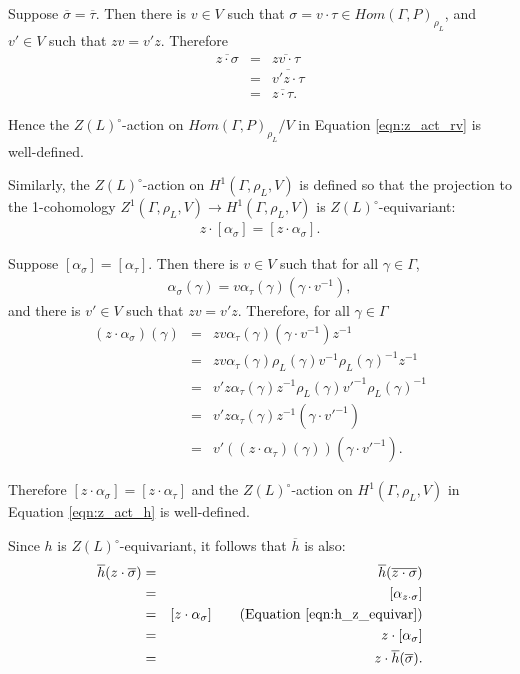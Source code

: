 Suppose $\overline{\sigma} = \overline{\tau}$. Then there is $v \in V$ such that $\sigma = v \cdot \tau \in Hom(\Gamma, P)_{\rho_L}$, and $v' \in V$ such that $zv = v' z$. Therefore
\begin{eqnarray*}
  \overline{z \cdot \sigma} &=& \overline{zv \cdot \tau} \\
  &=& \overline{v' z \cdot \tau} \\
  &=& \overline{z \cdot \tau}.
\end{eqnarray*}

Hence the $Z(L)^\circ$-action on $Hom(\Gamma, P)_{\rho_L}/V$ in Equation \ref{eqn:z_act_rv} is well-defined.

Similarly, the $Z(L)^\circ$-action on $H^1(\Gamma, \rho_L, V)$ is defined so that the projection to the 1-cohomology $Z^1(\Gamma, \rho_L, V) \rightarrow H^1(\Gamma, \rho_L, V)$ is $Z(L)^\circ$-equivariant:
\begin{eqnarray}
  z \cdot [\alpha_\sigma] = [z \cdot \alpha_\sigma].
  \label{eqn:z_act_h}
\end{eqnarray}

Suppose $[\alpha_\sigma] = [\alpha_\tau]$. Then there is $v \in V$ such that for all $\gamma \in \Gamma$,
\begin{eqnarray*}
  \alpha_\sigma(\gamma) = v \alpha_\tau(\gamma) (\gamma \cdot v^{-1}),
\end{eqnarray*}
and there is $v' \in V$ such that $zv = v' z$. Therefore, for all $\gamma \in \Gamma$
\begin{eqnarray*}
	(z \cdot \alpha_\sigma)(\gamma) 
  &=& z v \alpha_\tau(\gamma) (\gamma \cdot v^{-1}) z^{-1} \\
  &=& z v \alpha_\tau(\gamma) \rho_L(\gamma) v^{-1} \rho_L(\gamma)^{-1} z^{-1} \\
  &=& v' z \alpha_\tau(\gamma) z^{-1} \rho_L(\gamma) v'^{-1} \rho_L(\gamma)^{-1} \\
  &=& v' z \alpha_\tau(\gamma) z^{-1} (\gamma \cdot v'^{-1}) \\
  &=& v' ((z \cdot \alpha_\tau)(\gamma)) (\gamma \cdot v'^{-1}).
\end{eqnarray*}

Therefore $[z \cdot \alpha_\sigma] = [z \cdot \alpha_\tau]$ and the $Z(L)^\circ$-action on $H^1(\Gamma, \rho_L, V)$ in Equation \ref{eqn:z_act_h} is well-defined.

Since $h$ is $Z(L)^\circ$-equivariant, it follows that $\overline{h}$ is also:
\begin{eqnarray*}
  \overline{h}(z \cdot \overline{\sigma}) &=& \overline{h}(\overline{z \cdot \sigma}) \\
  &=& [\alpha_{z \cdot \sigma}] \\
  &=& [z \cdot \alpha_\sigma] \qquad (\textrm{Equation }\ref{eqn:h_z_equivar}) \\
  &=& z \cdot [\alpha_\sigma] \\
  &=& z \cdot \overline{h}(\overline{\sigma}).
\end{eqnarray*}

